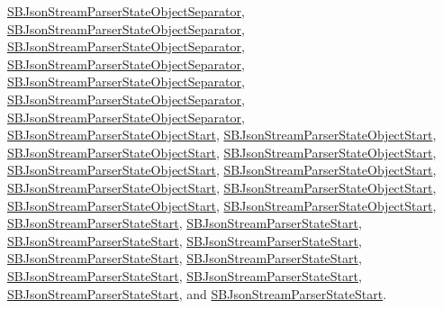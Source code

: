 \hyperlink{interface_s_b_json_stream_parser_state_object_separator}{\-S\-B\-Json\-Stream\-Parser\-State\-Object\-Separator}, \hyperlink{interface_s_b_json_stream_parser_state_object_separator}{\-S\-B\-Json\-Stream\-Parser\-State\-Object\-Separator}, \hyperlink{interface_s_b_json_stream_parser_state_object_separator}{\-S\-B\-Json\-Stream\-Parser\-State\-Object\-Separator}, \hyperlink{interface_s_b_json_stream_parser_state_object_separator}{\-S\-B\-Json\-Stream\-Parser\-State\-Object\-Separator}, \hyperlink{interface_s_b_json_stream_parser_state_object_separator}{\-S\-B\-Json\-Stream\-Parser\-State\-Object\-Separator}, \hyperlink{interface_s_b_json_stream_parser_state_object_separator}{\-S\-B\-Json\-Stream\-Parser\-State\-Object\-Separator}, \hyperlink{interface_s_b_json_stream_parser_state_object_separator}{\-S\-B\-Json\-Stream\-Parser\-State\-Object\-Separator}, \hyperlink{interface_s_b_json_stream_parser_state_object_start}{\-S\-B\-Json\-Stream\-Parser\-State\-Object\-Start}, \hyperlink{interface_s_b_json_stream_parser_state_object_start}{\-S\-B\-Json\-Stream\-Parser\-State\-Object\-Start}, \hyperlink{interface_s_b_json_stream_parser_state_object_start}{\-S\-B\-Json\-Stream\-Parser\-State\-Object\-Start}, \hyperlink{interface_s_b_json_stream_parser_state_object_start}{\-S\-B\-Json\-Stream\-Parser\-State\-Object\-Start}, \hyperlink{interface_s_b_json_stream_parser_state_object_start}{\-S\-B\-Json\-Stream\-Parser\-State\-Object\-Start}, \hyperlink{interface_s_b_json_stream_parser_state_object_start}{\-S\-B\-Json\-Stream\-Parser\-State\-Object\-Start}, \hyperlink{interface_s_b_json_stream_parser_state_object_start}{\-S\-B\-Json\-Stream\-Parser\-State\-Object\-Start}, \hyperlink{interface_s_b_json_stream_parser_state_object_start}{\-S\-B\-Json\-Stream\-Parser\-State\-Object\-Start}, \hyperlink{interface_s_b_json_stream_parser_state_object_start}{\-S\-B\-Json\-Stream\-Parser\-State\-Object\-Start}, \hyperlink{interface_s_b_json_stream_parser_state_object_start}{\-S\-B\-Json\-Stream\-Parser\-State\-Object\-Start}, \hyperlink{interface_s_b_json_stream_parser_state_start}{\-S\-B\-Json\-Stream\-Parser\-State\-Start}, \hyperlink{interface_s_b_json_stream_parser_state_start}{\-S\-B\-Json\-Stream\-Parser\-State\-Start}, \hyperlink{interface_s_b_json_stream_parser_state_start}{\-S\-B\-Json\-Stream\-Parser\-State\-Start}, \hyperlink{interface_s_b_json_stream_parser_state_start}{\-S\-B\-Json\-Stream\-Parser\-State\-Start}, \hyperlink{interface_s_b_json_stream_parser_state_start}{\-S\-B\-Json\-Stream\-Parser\-State\-Start}, \hyperlink{interface_s_b_json_stream_parser_state_start}{\-S\-B\-Json\-Stream\-Parser\-State\-Start}, \hyperlink{interface_s_b_json_stream_parser_state_start}{\-S\-B\-Json\-Stream\-Parser\-State\-Start}, \hyperlink{interface_s_b_json_stream_parser_state_start}{\-S\-B\-Json\-Stream\-Parser\-State\-Start}, \hyperlink{interface_s_b_json_stream_parser_state_start}{\-S\-B\-Json\-Stream\-Parser\-State\-Start}, and \hyperlink{interface_s_b_json_stream_parser_state_start}{\-S\-B\-Json\-Stream\-Parser\-State\-Start}.



